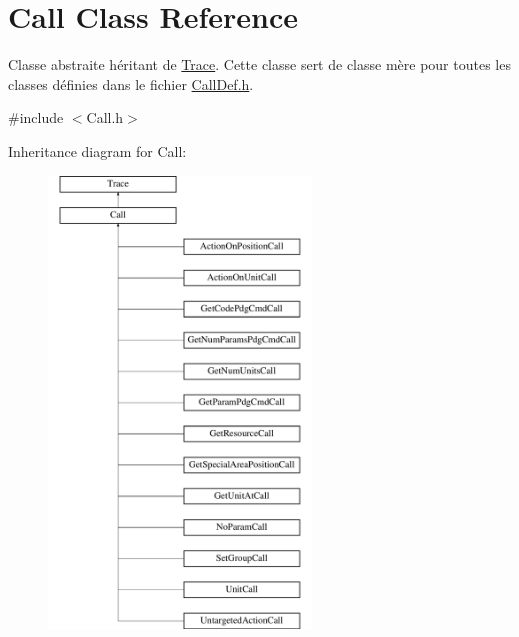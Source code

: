 \hypertarget{class_call}{}\section{Call Class Reference}
\label{class_call}


Classe abstraite héritant de \hyperlink{class_trace}{Trace}. Cette classe sert de classe mère pour toutes les classes définies dans le fichier \hyperlink{_call_def_8h}{Call\+Def.\+h}.  




{\ttfamily \#include $<$Call.\+h$>$}

Inheritance diagram for Call\+:\begin{figure}[H]
\begin{center}
\leavevmode
\includegraphics[height=12.000000cm]{class_call}
\end{center}
\end{figure}
